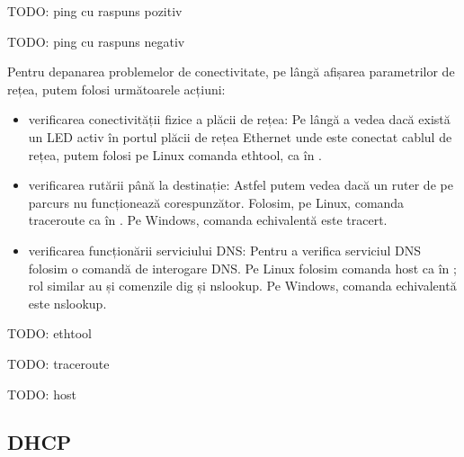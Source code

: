 \begin{screen}[caption={Verificarea conectivității (răspuns pozitiv)},label={lst:net:ping-positive}]
TODO: ping cu raspuns pozitiv
\end{screen}

\begin{screen}[caption={Verificarea conectivității (răspuns negativ)},label={lst:net:ping-negative}]
TODO: ping cu raspuns negativ
\end{screen}

Pentru depanarea problemelor de conectivitate, pe lângă afișarea parametrilor de rețea, putem folosi următoarele acțiuni:

\begin{itemize}
  \item verificarea conectivității fizice a plăcii de rețea: Pe lângă a vedea dacă există un LED activ în portul plăcii de rețea Ethernet unde este conectat cablul de rețea, putem folosi pe Linux comanda ethtool, ca în .
  \item verificarea rutării până la destinație: Astfel putem vedea dacă un ruter de pe parcurs nu funcționează corespunzător. Folosim, pe Linux, comanda traceroute ca în . Pe Windows, comanda echivalentă este tracert.
  \item verificarea funcționării serviciului DNS: Pentru a verifica serviciul DNS folosim o comandă de interogare DNS. Pe Linux folosim comanda host ca în ; rol similar au și comenzile dig și nslookup. Pe Windows, comanda echivalentă este nslookup.
\end{itemize}

\begin{screen}[caption={Verificarea conectivității fizice a plăcii de plăcii de rețea},label={lst:net:check-if}]
TODO: ethtool
\end{screen}

\begin{screen}[caption={Verificarea rutării până la destinație},label={lst:net:check-route}]
TODO: traceroute
\end{screen}

\begin{screen}[caption={Verificarea funcționării serviciului DNS},label={lst:net:check-dns}]
TODO: host
\end{screen}

\subsection{DHCP}
\label{sec:net:dhcp}

